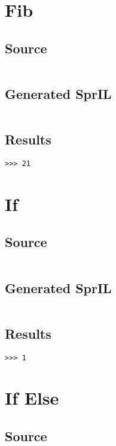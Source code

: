 \documentclass[twoside]{report}
\begin{document}
\section{Fib}
\subsection{Source}
\inputminted[tabsize=4,linenos,firstnumber=1]{text}{../../src/haskell/PP-project-2016/test/fib.shl}
\subsection{Generated SprIL}
\inputminted[tabsize=4,linenos,firstnumber=0]{text}{../../src/haskell/PP-project-2016/test/fib_gen.txt}
\subsection{Results}
\begin{verbatim}
>>> 21
\end{verbatim}

\section{If}
\subsection{Source}
\inputminted[tabsize=4,linenos,firstnumber=1]{text}{../../src/haskell/PP-project-2016/test/if.shl}
\subsection{Generated SprIL}
\inputminted[tabsize=4,linenos,firstnumber=0]{text}{../../src/haskell/PP-project-2016/test/if_gen.txt}
\subsection{Results}
\begin{verbatim}
>>> 1
\end{verbatim}

\section{If Else}
\subsection{Source}
\inputminted[tabsize=4,linenos,firstnumber=1]{text}{../../src/haskell/PP-project-2016/test/ifelse.shl}
\end{document}

